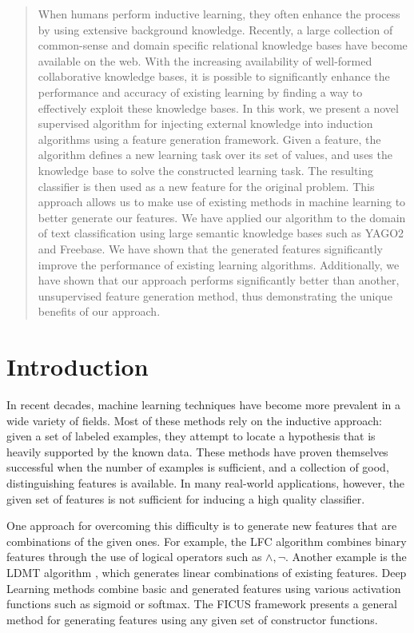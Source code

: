 \documentclass[twoside,11pt]{article}
\theoremstyle{definition}
\begin{document}
\begin{abstract}
	When humans perform inductive learning, they often enhance the process by using extensive background knowledge.
	 Recently, a large collection of common-sense and domain specific relational knowledge bases have become available on the web.
	With the increasing availability of well-formed collaborative knowledge bases, it is possible to significantly enhance the performance and accuracy of existing learning by finding a way to effectively exploit these knowledge bases. 
	In this work, we present a novel supervised algorithm for injecting external knowledge into induction algorithms using a feature generation framework. Given a feature, the algorithm defines a new learning task over its set of values, and uses the knowledge base to solve the constructed learning task. The resulting classifier is then used as a new feature for the original problem.
	This approach allows us to make use of existing methods in machine learning to better generate our features.
	We have applied our algorithm to the domain of text classification using large semantic knowledge bases such as YAGO2 and Freebase. We have shown that the generated features significantly improve the performance of existing learning algorithms.
	Additionally, we have shown that our approach performs significantly better than another, unsupervised feature generation method, thus demonstrating the unique benefits of our approach.
\end{abstract}

\clearpage
{}


\section{Introduction}
\label{sec:Intro}
In recent decades, machine learning techniques have become more prevalent in a wide variety of fields. %
Most of these methods rely on the inductive approach: given a set of labeled examples, they attempt to locate a hypothesis that is heavily supported by the known data. These methods have proven themselves successful when the number of examples is sufficient, and a collection of good,
distinguishing features is available.
In many real-world applications, however, the given set of features is not sufficient for inducing a high quality classifier.

One approach for overcoming this difficulty is to generate new features that are combinations of the given ones.
For example, the LFC algorithm  combines binary features through the use of logical operators such as $\land ,\lnot$.
Another example is the LDMT algorithm \cite{utgo1991linear}, which generates linear combinations of existing features.
Deep Learning methods combine basic and generated features using various activation functions such as sigmoid or softmax.
The FICUS framework \cite{markovitch2002feature} presents a general method for generating features using any given set of constructor functions.
\end{document}
